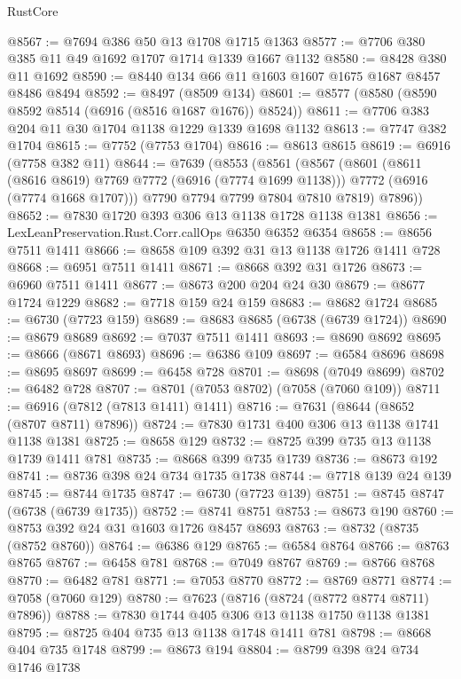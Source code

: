 \begin{lexlean}{RustCore}
\begin{coremodule}
@8567 := @7694 @386 @50 @13 @1708 @1715 @1363
@8577 := @7706 @380 @385 @11 @49 @1692 @1707 @1714 @1339 @1667 @1132
@8580 := @8428 @380 @11 @1692
@8590 := @8440 @134 @66 @11 @1603 @1607 @1675 @1687 @8457 @8486 @8494
@8592 := @8497 (@8509 @134)
@8601 := @8577 (@8580 (@8590 @8592 @8514 (@6916 (@8516 @1687 @1676)) @8524))
@8611 := @7706 @383 @204 @11 @30 @1704 @1138 @1229 @1339 @1698 @1132
@8613 := @7747 @382 @1704
@8615 := @7752 (@7753 @1704)
@8616 := @8613 @8615
@8619 := @6916 (@7758 @382 @11)
@8644 := @7639
    (@8553
      (@8561
        (@8567
          (@8601
            (@8611 (@8616 @8619) @7769 @7772 (@6916 (@7774 @1699 @1138)))
            @7772
            (@6916 (@7774 @1668 @1707)))
          @7790
          @7794
          @7799
          @7804
          @7810
          @7819)
        @7896))
@8652 := @7830 @1720 @393 @306 @13 @1138 @1728 @1138 @1381
@8656 := LexLeanPreservation.Rust.Corr.callOps @6350 @6352 @6354
@8658 := @8656 @7511 @1411
@8666 := @8658 @109 @392 @31 @13 @1138 @1726 @1411 @728
@8668 := @6951 @7511 @1411
@8671 := @8668 @392 @31 @1726
@8673 := @6960 @7511 @1411
@8677 := @8673 @200 @204 @24 @30
@8679 := @8677 @1724 @1229
@8682 := @7718 @159 @24 @159
@8683 := @8682 @1724
@8685 := @6730 (@7723 @159)
@8689 := @8683 @8685 (@6738 (@6739 @1724))
@8690 := @8679 @8689
@8692 := @7037 @7511 @1411
@8693 := @8690 @8692
@8695 := @8666 (@8671 @8693)
@8696 := @6386 @109
@8697 := @6584 @8696
@8698 := @8695 @8697
@8699 := @6458 @728
@8701 := @8698 (@7049 @8699)
@8702 := @6482 @728
@8707 := @8701 (@7053 @8702) (@7058 (@7060 @109))
@8711 := @6916 (@7812 (@7813 @1411) @1411)
@8716 := @7631 (@8644 (@8652 (@8707 @8711) @7896))
@8724 := @7830 @1731 @400 @306 @13 @1138 @1741 @1138 @1381
@8725 := @8658 @129
@8732 := @8725 @399 @735 @13 @1138 @1739 @1411 @781
@8735 := @8668 @399 @735 @1739
@8736 := @8673 @192
@8741 := @8736 @398 @24 @734 @1735 @1738
@8744 := @7718 @139 @24 @139
@8745 := @8744 @1735
@8747 := @6730 (@7723 @139)
@8751 := @8745 @8747 (@6738 (@6739 @1735))
@8752 := @8741 @8751
@8753 := @8673 @190
@8760 := @8753 @392 @24 @31 @1603 @1726 @8457 @8693
@8763 := @8732 (@8735 (@8752 @8760))
@8764 := @6386 @129
@8765 := @6584 @8764
@8766 := @8763 @8765
@8767 := @6458 @781
@8768 := @7049 @8767
@8769 := @8766 @8768
@8770 := @6482 @781
@8771 := @7053 @8770
@8772 := @8769 @8771
@8774 := @7058 (@7060 @129)
@8780 := @7623 (@8716 (@8724 (@8772 @8774 @8711) @7896))
@8788 := @7830 @1744 @405 @306 @13 @1138 @1750 @1138 @1381
@8795 := @8725 @404 @735 @13 @1138 @1748 @1411 @781
@8798 := @8668 @404 @735 @1748
@8799 := @8673 @194
@8804 := @8799 @398 @24 @734 @1746 @1738

\end{coremodule}
\end{lexlean}
